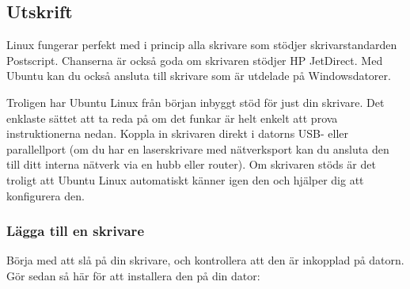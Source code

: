 \documentclass[a4paper,final]{memoir} %
\begin{document}


\subsection{Utskrift}


Linux fungerar perfekt med i princip alla skrivare som stödjer skrivarstandarden Postscript. Chanserna är också goda om skrivaren stödjer HP JetDirect. Med Ubuntu kan du också ansluta till skrivare som är utdelade på Windowsdatorer.

Troligen har Ubuntu Linux från början inbyggt stöd för just din skrivare. Det enklaste sättet att ta reda på om det funkar är helt enkelt att prova instruktionerna nedan. Koppla in skrivaren direkt i datorns USB- eller parallellport (om du har en laserskrivare med nätverksport kan du ansluta den till ditt interna nätverk via en hubb eller router). Om skrivaren stöds är det troligt att Ubuntu Linux automatiskt känner igen den och hjälper dig att konfigurera den.


\subsubsection{Lägga till en skrivare}

Börja med att slå på din skrivare, och kontrollera att den är inkopplad på datorn. Gör sedan så här för att installera den på din dator:
\end{document}
